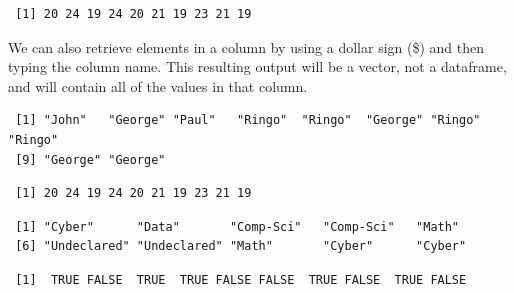 \documentclass[
  letterpaper,
  DIV=11,
  numbers=noendperiod]{scrreprt}
\newenvironment{Shaded}{\begin{snugshade}}{\end{snugshade}}
\newcommand{\NormalTok}[1]{\textcolor[rgb]{0.00,0.23,0.31}{#1}}
\newcommand{\SpecialCharTok}[1]{\textcolor[rgb]{0.37,0.37,0.37}{#1}}
\begin{document}
\begin{verbatim}
 [1] 20 24 19 24 20 21 19 23 21 19
\end{verbatim}

We can also retrieve elements in a column by using a dollar sign (\$)
and then typing the column name. This resulting output will be a vector,
not a dataframe, and will contain all of the values in that column.

\begin{Shaded}
\end{Shaded}

\begin{verbatim}
 [1] "John"   "George" "Paul"   "Ringo"  "Ringo"  "George" "Ringo"  "Ringo" 
 [9] "George" "George"
\end{verbatim}

\begin{Shaded}
\end{Shaded}

\begin{verbatim}
 [1] 20 24 19 24 20 21 19 23 21 19
\end{verbatim}

\begin{Shaded}
\end{Shaded}

\begin{verbatim}
 [1] "Cyber"      "Data"       "Comp-Sci"   "Comp-Sci"   "Math"      
 [6] "Undeclared" "Undeclared" "Math"       "Cyber"      "Cyber"     
\end{verbatim}

\begin{Shaded}
\end{Shaded}

\begin{verbatim}
 [1]  TRUE FALSE  TRUE  TRUE FALSE FALSE  TRUE FALSE  TRUE FALSE
\end{verbatim}
\end{document}

